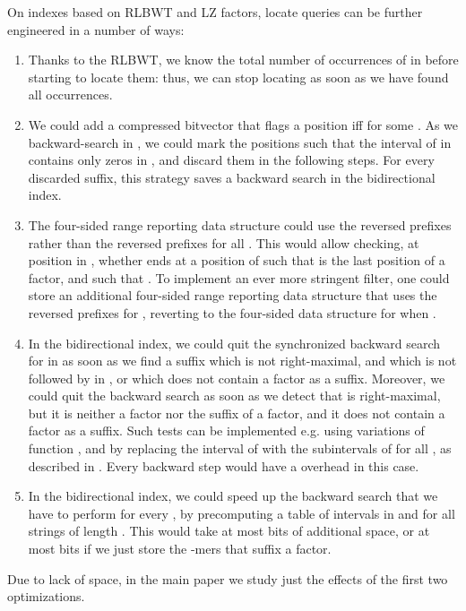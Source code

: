 \documentclass[a4paper,UKenglish]{lipics-v2016}
\begin{document}
On indexes based on RLBWT and LZ factors, locate queries can be further engineered in a number of ways:
\begin{enumerate}
\item Thanks to the RLBWT, we know the total number of occurrences of  in  before starting to locate them: thus, we can stop locating as soon as we have found all occurrences.

\item We could add a compressed bitvector  that flags a position  iff  for some . As we backward-search  in , we could mark the positions  such that the interval of  in  contains only zeros in , and discard them in the following steps. For every discarded suffix, this strategy saves a  backward search in the bidirectional index.


\item The four-sided range reporting data structure could use the reversed prefixes  rather than the reversed prefixes  for all . This would allow checking, at position  in , whether  ends at a position  of  such that  is the last position of a factor, and such that . To implement an ever more stringent filter, one could store an additional four-sided range reporting data structure that uses the reversed prefixes  for , reverting to the four-sided data structure for  when .

\item In the bidirectional index, we could quit the synchronized backward search for  in  as soon as we find a suffix  which is not right-maximal, and which is not followed by  in , or which does not contain a factor as a suffix. Moreover, we could quit the backward search as soon as we detect that  is right-maximal, but it is neither a factor nor the suffix of a factor, and it does not contain a factor as a suffix. Such tests can be implemented e.g. using variations of function , and by replacing the interval of  with the  subintervals of  for all , as described in \cite{belazzougui2014linear}. Every backward step would have a  overhead in this case.

\item In the bidirectional index, we could speed up the backward search that we have to perform for every , by precomputing a table of intervals in  and  for all strings of length . This would take at most  bits of additional space, or at most  bits if we just store the -mers that suffix a factor.
\end{enumerate}

Due to lack of space, in the main paper we study just the effects of the first two optimizations.
\end{document}

